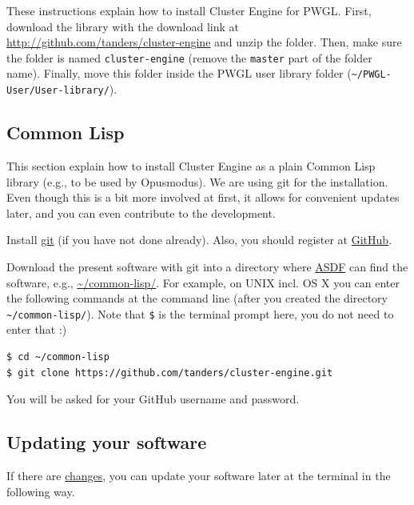These instructions explain how to install Cluster Engine for PWGL. First, download the library with the download link at \url{http://github.com/tanders/cluster-engine} and unzip the folder. Then, make sure the folder is named \texttt{cluster-engine} (remove the \texttt{master} part of the folder name). Finally, move this folder inside the PWGL user library folder (\texttt{\textasciitilde{}/PWGL-User/User-library/}). 


\subsection*{Common Lisp}
\label{sec:org2f92fa5}

This section explain how to install Cluster Engine as a plain Common Lisp library (e.g., to be used by Opusmodus). We are using git for the installation. Even though this is a bit more involved at first, it allows for convenient updates later, and you can even contribute to the development. 

Install \href{https://git-scm.com}{git} (if you have not done already). Also, you should register at \href{https://github.com}{GitHub}.

Download the present software with git into a directory where \href{https://common-lisp.net/project/asdf/}{ASDF} can find the software, e.g., \href{https://common-lisp.net/project/asdf/asdf/Quick-start-summary.html\#Quick-start-summary}{\textasciitilde{}/common-lisp/}. For example, on UNIX incl. OS X you can enter the following commands at the command line (after you created the directory \texttt{\textasciitilde{}/common-lisp/}). Note that \texttt{\$} is the terminal prompt here, you do not need to enter that :)

\lstset{language=bash,label= ,caption= ,captionpos=b,numbers=none}
\begin{lstlisting}
$ cd ~/common-lisp
$ git clone https://github.com/tanders/cluster-engine.git
\end{lstlisting}

You will be asked for your GitHub username and password.


\subsection*{Updating your software}
\label{sec:orgd3c4747}

If there are \href{https://github.com/tanders/cluster-engine/commits/master}{changes}, you can update your software later at the terminal in the following way.

